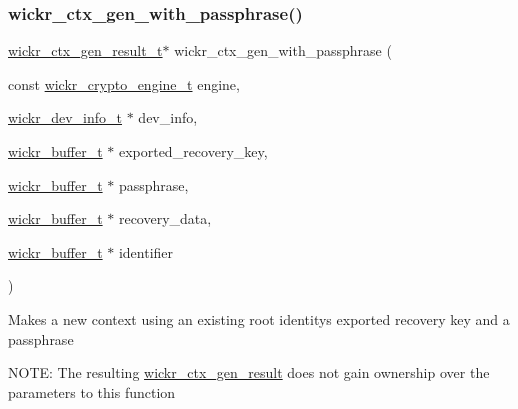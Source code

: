 \subsubsection{\texorpdfstring{wickr\_ctx\_gen\_with\_passphrase()}{wickr\_ctx\_gen\_with\_passphrase()}}
{\footnotesize\ttfamily \mbox{\hyperlink{structwickr__ctx__gen__result}{wickr\+\_\+ctx\+\_\+gen\+\_\+result\+\_\+t}}$\ast$ wickr\+\_\+ctx\+\_\+gen\+\_\+with\+\_\+passphrase (\begin{DoxyParamCaption}\item[{const \mbox{\hyperlink{structwickr__crypto__engine}{wickr\+\_\+crypto\+\_\+engine\+\_\+t}}}]{engine,  }\item[{\mbox{\hyperlink{structwickr__dev__info}{wickr\+\_\+dev\+\_\+info\+\_\+t}} $\ast$}]{dev\+\_\+info,  }\item[{\mbox{\hyperlink{structwickr__buffer}{wickr\+\_\+buffer\+\_\+t}} $\ast$}]{exported\+\_\+recovery\+\_\+key,  }\item[{\mbox{\hyperlink{structwickr__buffer}{wickr\+\_\+buffer\+\_\+t}} $\ast$}]{passphrase,  }\item[{\mbox{\hyperlink{structwickr__buffer}{wickr\+\_\+buffer\+\_\+t}} $\ast$}]{recovery\+\_\+data,  }\item[{\mbox{\hyperlink{structwickr__buffer}{wickr\+\_\+buffer\+\_\+t}} $\ast$}]{identifier }\end{DoxyParamCaption})}

Makes a new context using an existing root identity\textquotesingle{}s exported recovery key and a passphrase

N\+O\+TE\+: The resulting \mbox{\hyperlink{structwickr__ctx__gen__result}{wickr\+\_\+ctx\+\_\+gen\+\_\+result}} does not gain ownership over the parameters to this function


